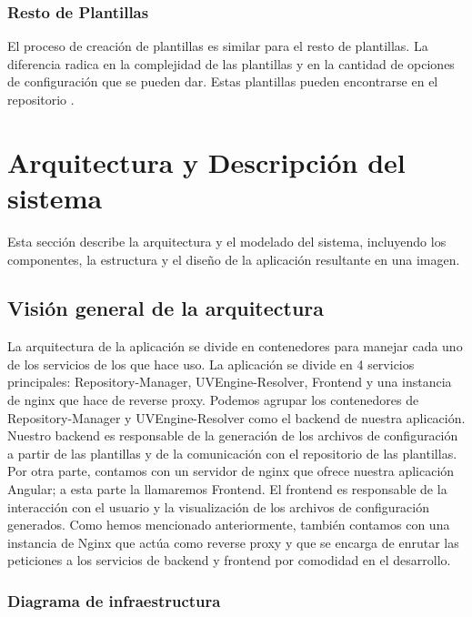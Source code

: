 \documentclass[12pt, a4paper, twoside]{article}
\begin{document}
\newpage
\subsubsection{Resto de Plantillas}
El proceso de creación de plantillas es similar para el resto de plantillas. La diferencia radica en la complejidad de las plantillas y en la cantidad de opciones de configuración que se pueden dar.
Estas plantillas pueden encontrarse en el repositorio \cite{m4rdom_templates}.














\section{Arquitectura y Descripción del sistema }
\label{sec:Arquitectura y Descripción del sistema}
Esta sección describe la arquitectura y el modelado del sistema, incluyendo los componentes, la estructura y el diseño de la aplicación resultante en una imagen.
\subsection{Visión general de la arquitectura }
La arquitectura de la aplicación se divide en contenedores para manejar cada uno de los servicios de los que hace uso.
La aplicación se divide en 4 servicios principales: Repository-Manager, UVEngine-Resolver, Frontend y una instancia de nginx que hace de reverse proxy.
Podemos agrupar los contenedores de Repository-Manager y UVEngine-Resolver como el backend de nuestra aplicación.
Nuestro backend es responsable de la generación de los archivos de configuración a partir de las plantillas y de la comunicación con el repositorio de las plantillas.
Por otra parte, contamos con un servidor de nginx que ofrece nuestra aplicación Angular; a esta parte la llamaremos Frontend.
El frontend es responsable de la interacción con el usuario y la visualización de los archivos de configuración generados.
Como hemos mencionado anteriormente, también contamos con una instancia de Nginx que actúa como reverse proxy y que se encarga de enrutar las peticiones a los servicios de backend y frontend por comodidad en el desarrollo. 

\newpage 
\subsubsection{Diagrama de infraestructura}
\end{document}

